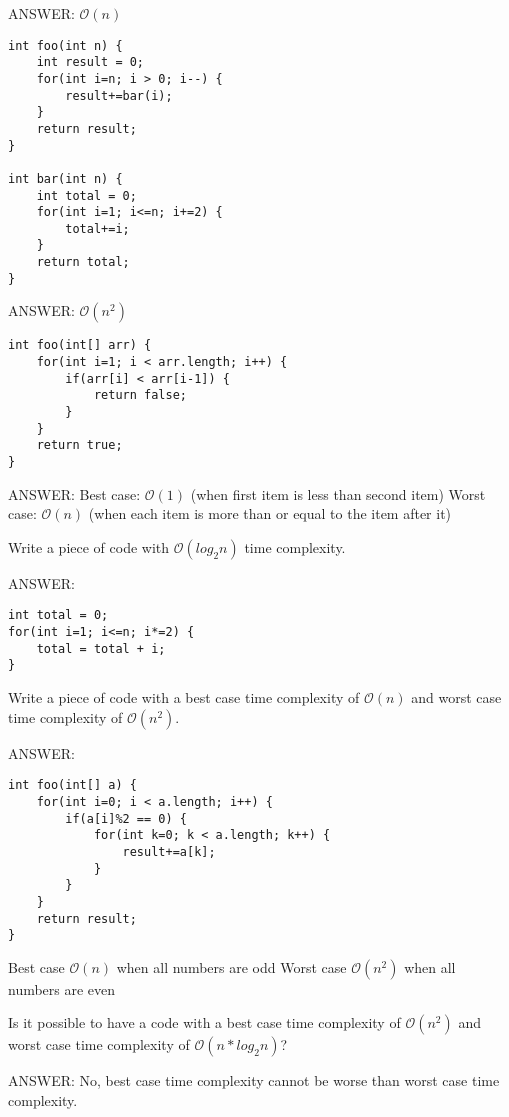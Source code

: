 \begin{questions}
\ifprintanswers
ANSWER: $\mathcal{O}(n)$
\else
\fi

\begin{lstlisting}
int foo(int n) {
	int result = 0;
	for(int i=n; i > 0; i--) {
		result+=bar(i);
	}
	return result;
}

int bar(int n) {
	int total = 0;
	for(int i=1; i<=n; i+=2) {
		total+=i;
	}
	return total;
}
\end{lstlisting}

\ifprintanswers
ANSWER: $\mathcal{O}(n^2)$
\else
\fi

\begin{lstlisting}
int foo(int[] arr) {
	for(int i=1; i < arr.length; i++) {
		if(arr[i] < arr[i-1]) {
			return false;
		}
	}
	return true;
}
\end{lstlisting}

\ifprintanswers
ANSWER: 
Best case: $\mathcal{O}(1)$ (when first item is less than second item)
Worst case: $\mathcal{O}(n)$ (when each item is more than or equal to the item after it)
\else
\fi

\question Write a piece of code with $\mathcal{O}(log_2n)$ time complexity.

\ifprintanswers
ANSWER: 
\begin{lstlisting}
int total = 0;
for(int i=1; i<=n; i*=2) {
	total = total + i;
}
\end{lstlisting}

\else
\fi

\question Write a piece of code with a best case time complexity of $\mathcal{O}(n)$ and worst case time complexity of $\mathcal{O}(n^2)$.

\ifprintanswers
ANSWER: 
\begin{lstlisting}
int foo(int[] a) {
	for(int i=0; i < a.length; i++) {
		if(a[i]%2 == 0) { 
			for(int k=0; k < a.length; k++) {
				result+=a[k];
			}
		}
	}
	return result;
}
\end{lstlisting}
Best case $\mathcal{O}(n)$ when all numbers are odd
Worst case $\mathcal{O}(n^2)$ when all numbers are even
\else
\fi

\question Is it possible to have a code with a best case time complexity of $\mathcal{O}(n^2)$ and worst case time complexity of $\mathcal{O}(n*log_2n)$?

\ifprintanswers
ANSWER: 
No, best case time complexity cannot be worse than worst case time complexity.
\else
\fi

\end{questions}

